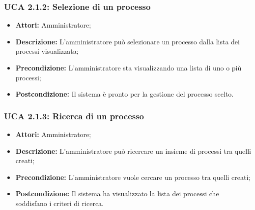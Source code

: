\hypertarget{A2.1.2}{}
\subsubsection{UCA 2.1.2: Selezione di un processo}
\begin{itemize}
\item \textbf{Attori:} Amministratore;
\item \textbf{Descrizione:} L'amministratore può selezionare un processo dalla lista dei processi visualizzata;
\item \textbf{Precondizione:} L'amministratore sta visualizzando una lista di uno o più processi;
\item \textbf{Postcondizione:} Il sistema è pronto per la gestione del processo scelto.
\end{itemize}

\hypertarget{A2.1.3}{}
\subsubsection{UCA 2.1.3: Ricerca di un processo}
\begin{itemize}
\item \textbf{Attori:} Amministratore;
\item \textbf{Descrizione:} L'amministratore può ricercare un insieme di processi tra quelli creati;
\item \textbf{Precondizione:} L'amministratore vuole cercare un processo tra quelli creati;
\item \textbf{Postcondizione:} Il sistema ha visualizzato la lista dei processi che soddisfano i criteri di ricerca.
\end{itemize}

\hypertarget{A2.2}{}
